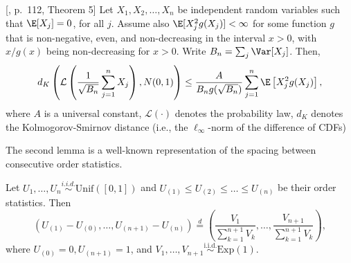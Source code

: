 \begin{lemma}\label{lem:Berry_Esseen}[\cite{petrov1975independent}, p.~112, Theorem 5]
Let $X_1, X_2, \ldots, X_{n}$ be independent random variables such that $\E[X_j] = 0$, for all $j$. Assume also $\E[X_j^2 g(X_j)] < \infty$ for some function $g$ that is non-negative, even, and non-decreasing in the interval $x > 0$, with $x / g(x)$ being non-decreasing for $x > 0$. Write $B_{n} = \sum_{j}\Var[X_j]$. Then,
\[d_{K}\left(\mathcal{L}\left(\frac{1}{\sqrt{B_{n}}}\sum_{j=1}^{n}X_j\right), N(0, 1)\right)\le \frac{A}{B_n g(\sqrt{B_n})}\sum_{j=1}^{n}\E\left[X_j^2 g(X_j)\right],\]
where $A$ is a universal constant, $\mathcal{L}(\cdot)$ denotes the probability law, $d_{K}$ denotes the Kolmogorov-Smirnov distance (i.e., the $\ell_{\infty}$-norm of the difference of CDFs)
\end{lemma}

The second lemma is a well-known representation of the spacing between consecutive order statistics.
\begin{lemma}\label{lem:moran}
  Let $U_1, \ldots, U_n\stackrel{i.i.d.}{\sim}\mathrm{Unif}([0, 1])$ and $U_{(1)} \le U_{(2)}\le \ldots \le U_{(n)}$ be their order statistics. Then
\[
(U_{(1)} - U_{(0)}, \ldots, U_{(n+1)} - U_{(n)}) \stackrel{d}{=} \left(\frac{V_1}{\sum_{k=1}^{n+1}V_{k}}, \ldots, \frac{V_{n+1}}{\sum_{k=1}^{n+1}V_{k}}\right),
\]
where $U_{(0)} = 0, U_{(n + 1)}= 1$, and $V_{1},\ldots, V_{n+1}\stackrel{\mathrm{i.i.d.}}{\sim}\mathrm{Exp}(1)$.
\end{lemma}

